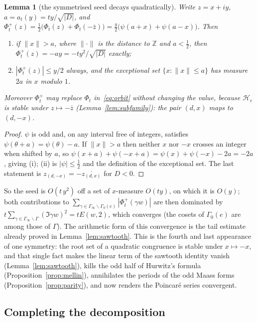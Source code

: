 \documentclass[11pt,a4paper]{article}
\newtheorem{lemma}[theorem]{Lemma}
\theoremstyle{remark}\newtheorem{remark}[theorem]{Remark}
\newcommand{\Z}{\mathbb Z}\newcommand{\R}{\mathbb R}\newcommand{\Q}{\mathbb Q}\newcommand{\C}{\mathbb C}
\begin{document}
\begin{lemma}[the symmetrised seed decays quadratically]\label{lem:seed}
Write $z=x+iy$, $a=a_t(y)=ty/\sqrt{|D|}$, and
$\Phi^+_t(z)=\tfrac12\bigl(\Phi_t(z)+\Phi_t(-\bar z)\bigr)=\tfrac y2\bigl(\psi(a+x)+\psi(a-x)\bigr)$. Then
\begin{enumerate}
\item[(i)] if $\|x\|>a$, where $\|\cdot\|$ is the distance to $\Z$ and $a<\tfrac12$, then
$\Phi^+_t(z)=-ay=-ty^2/\sqrt{|D|}$ exactly;
\item[(ii)] $|\Phi^+_t(z)|\le y/2$ always, and the exceptional set $\{x:\|x\|\le a\}$ has measure $2a$ in $x$
modulo $1$.
\end{enumerate}
Moreover $\Phi^+_t$ may replace $\Phi_t$ in~\eqref{eq:orbit} without changing the value, because $\mathcal H_e$ is
stable under $z\mapsto-\bar z$ (Lemma~\ref{lem:subfamily}): the pair $(d,x)$ maps to $(d,-x)$.
\end{lemma}
\begin{proof}
$\psi$ is odd and, on any interval free of integers, satisfies $\psi(\theta+a)=\psi(\theta)-a$. If $\|x\|>a$ then
neither $x$ nor $-x$ crosses an integer when shifted by $a$, so
$\psi(x+a)+\psi(-x+a)=\psi(x)+\psi(-x)-2a=-2a$, giving (i); (ii) is $|\psi|\le\tfrac12$ and the definition of the
exceptional set. The last statement is $z_{(d,-x)}=-\overline{z_{(d,x)}}$ for $D<0$.
\end{proof}

So the seed is $O(t\,y^2)$ off a set of $x$-measure $O(ty)$, on which it is $O(y)$; both contributions to
$\sum_{\gamma\in\Gamma_\infty\backslash\Gamma_0(e)}|\Phi^+_t(\gamma w)|$ are then dominated by
$t\sum_{\gamma\in\Gamma_\infty\backslash\Gamma}(\Im\gamma w)^2=tE(w,2)$, which converges (the cosets of $\Gamma_0(e)$
are among those of $\Gamma$). The
arithmetic form of this convergence is the tail estimate already proved in Lemma~\ref{lem:sawtooth}. This is the
fourth and last appearance of one symmetry: the root set of a quadratic congruence is stable under $x\mapsto-x$, and
that single fact makes the linear term of the sawtooth identity vanish (Lemma~\ref{lem:sawtooth}), kills the odd half
of Hurwitz's formula (Proposition~\ref{prop:mellin}), annihilates the periods of the odd Maass forms
(Proposition~\ref{prop:parity}), and now renders the Poincar\'e series convergent.

\subsection{Completing the decomposition}\label{sec:complete}
\end{document}
